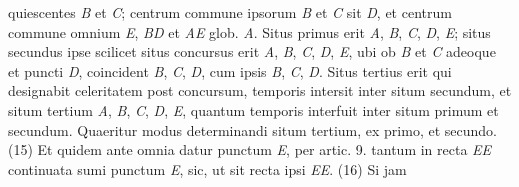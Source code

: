 quiescentes
\textit{B} et \textit{C}; centrum
commune ipsorum \textit{B} et \textit{C} sit \textit{D}, 
et centrum commune omnium \textit{E}, 
\textit{BD}
et \textit{AE}
glob. \textit{A}. Situs primus erit \textit{A}, \textit{B}, \textit{C}, \textit{D}, \textit{E}; situs secundus ipse scilicet 
situs concursus 
erit \textit{A}, \textit{B}, \textit{C}, \textit{D}, \textit{E}, ubi ob
\textit{B} et \textit{C} adeoque et puncti \textit{D}, coincident \textit{B}, \textit{C}, \textit{D}, cum ipsis \textit{B}, \textit{C}, \textit{D}. 
Situs tertius erit qui designabit celeritatem post concursum, 
temporis intersit inter situm secundum, et situm tertium \textit{A}, \textit{B}, \textit{C}, \textit{D}, \textit{E}, quantum temporis interfuit inter situm primum et secundum. Quaeritur modus determinandi situm tertium, ex primo, et secundo. 
\pend
\pstart
(15) Et quidem ante omnia datur punctum \textit{E}, per artic. 9.
tantum in recta \textit{EE} continuata sumi punctum \textit{E}, sic, ut sit recta
ipsi \textit{EE}.
\pend
\pstart
(16) Si jam
